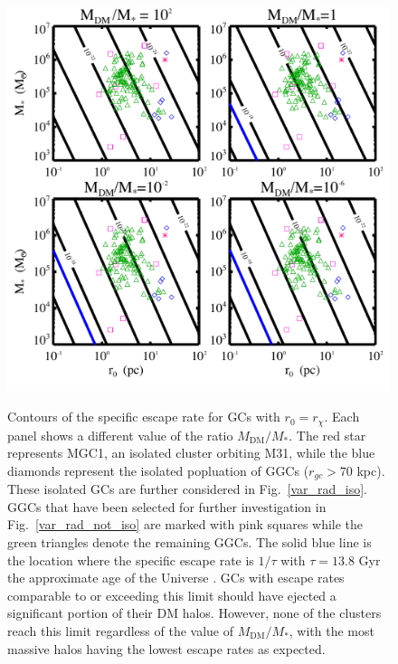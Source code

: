 \documentclass[aps,floatfix,prd,showpacs]{revtex4}
\newcommand{\rx}{r_\chi}
\newcommand{\MDM}{M_{\mathrm{DM}}}
\begin{document}
\begin{figure}[htp]
\centering
\includegraphics[width=12cm, height=12cm]{EscapePlummer}
\caption{Contours of the specific escape rate for GCs with $r_0 = \rx$.  Each panel shows a different value of the ratio $\MDM/M_*$.  The red star represents MGC1, an isolated cluster orbiting M31, while the blue diamonds represent the isolated popluation of GGCs ($r_{gc} > 70$ kpc).  These isolated GCs are further considered in Fig.~\ref{var_rad_iso}.  GGCs that have been selected for further investigation in Fig.~\ref{var_rad_not_iso} are marked with pink squares while the green triangles denote the remaining GGCs.  The solid blue line is the location where the specific escape rate is $1/\tau$ with $\tau = 13.8$ Gyr the approximate age of the Universe \cite{Planck15}.  GCs with escape rates comparable to or exceeding this limit should have ejected a significant portion of their DM halos.  However, none of the clusters reach this limit regardless of the value of $\MDM/M_*$, with the most massive halos having the lowest escape rates as expected.}  
\label{EscapePlummer1}
\end{figure}
\end{document}
